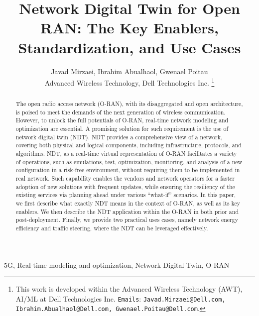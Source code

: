 \documentclass[]{IEEEtran}
\begin{document}
	\title{Network Digital Twin for Open RAN: The Key Enablers, Standardization, and Use Cases}
	
	\author{Javad Mirzaei, Ibrahim Abualhaol, Gwenael Poitau\\
		\small {Advanced Wireless Technology, Dell Technologies Inc.}
		\thanks{This work is developed within the Advanced Wireless Technology (AWT), AI/ML at Dell Technologies Inc. \texttt{Emails}: \texttt{Javad.Mirzaei@Dell.com, Ibrahim.Abualhaol@Dell.com, Gwenael.Poitau@Dell.com}.}%
	}
	

	\maketitle
	
	\begin{abstract}
		 \label{sec:Abs}
The open radio access network (O-RAN), with its disaggregated and open architecture, is poised to meet the demands of the next generation of wireless communication. However, to unlock the full potentials of O-RAN, real-time network modeling and optimization are essential. 
A promising solution for such requirement is the use of network digital twin (NDT). NDT provides a comprehensive view of a network, covering both physical and logical components, including infrastructure, protocols, and algorithms. NDT, as a real-time virtual representation of O-RAN facilitates a variety of operations, such as emulations, test, optimization, monitoring, and analysis of a new configuration in a risk-free environment, without requiring them to be implemented in real network. Such capability enables the vendors and network operators for a faster adoption of new solutions with frequent updates, while ensuring the resiliency of the existing services via planning ahead under various “what-if” scenarios.  In this paper, we first describe what exactly NDT means in the context of O-RAN, as well as its key enablers. We then describe the NDT application within the O-RAN in both prior and post-deployment. Finally, we provide two practical uses cases, namely network energy efficiency and traffic steering, where the NDT can be leveraged effectively.

	\end{abstract}
	
\begin{IEEEkeywords}
	5G,
	Real-time modeling and optimization,
	Network Digital Twin,
	O-RAN
\end{IEEEkeywords}
\end{document}
